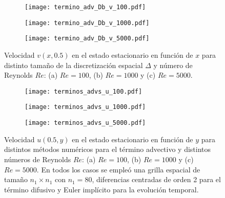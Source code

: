 \documentclass[aps,prb,twocolumn,superscriptaddress,floatfix,longbibliography,10pt]{revtex4-2}
\newcounter{para}
\begin{document}
\begin{figure}
  \centering
  
  \begin{subfigure}[b]{0.32\textwidth}
    \centering
    \texttt{[image: termino\_adv\_Db\_v\_100.pdf]}
    \caption{}
    \label{fig:termino_adv_Db_v_100}
\end{subfigure}
\hfill
\begin{subfigure}[b]{0.32\textwidth}
    \centering
    \texttt{[image: termino\_adv\_Db\_v\_1000.pdf]}
    \caption{}
    \label{fig:termino_adv_Db_v_1000}
\end{subfigure}
\hfill
\begin{subfigure}[b]{0.32\textwidth}
    \centering
    \texttt{[image: termino\_adv\_Db\_v\_5000.pdf]}
    \caption{}
    \label{fig:termino_adv_Db_v_5000}
\end{subfigure}
     \caption{Velocidad $v(x,0.5)$ en el estado estacionario en función de $x$ para distinto tamaño de la discretización espacial $\Delta$ y número de Reynolds $Re$: (a) $Re = 100$, (b) $Re = 1000$ y (c) $Re = 5000$.}
     \label{fig:velocidades_v_DC2_vs_Re}
\end{figure}






\begin{figure}
  \centering
  \begin{subfigure}[b]{0.32\textwidth}
      \centering
      \texttt{[image: terminos\_advs\_u\_100.pdf]}
      \caption{}
      \label{fig:terminos_advs_u_100}
  \end{subfigure}
  \hfill
  \begin{subfigure}[b]{0.32\textwidth}
      \centering
      \texttt{[image: terminos\_advs\_u\_1000.pdf]}
      \caption{}
      \label{fig:terminos_advs_u_1000}
  \end{subfigure}
  \hfill
  \begin{subfigure}[b]{0.32\textwidth}
      \centering
      \texttt{[image: terminos\_advs\_u\_5000.pdf]}
      \caption{}
      \label{fig:terminos_advs_u_5000}
  \end{subfigure}
     \caption{Velocidad $u(0.5,y)$ en el estado estacionario en función de $y$ para distintos métodos numéricos para el término advectivo y distintos números de Reynolds $Re$: (a) $Re = 100$, (b) $Re = 1000$ y (c) $Re = 5000$. En todos los casos se empleó una grilla espacial de tamaño $n_1 \times n_1$ con $n_1 = 80$, diferencias centradas de orden 2 para el término difusivo y Euler implícito para la evolución temporal.}
     \label{fig:terminos_advs_u}
\end{figure}
\end{document}

